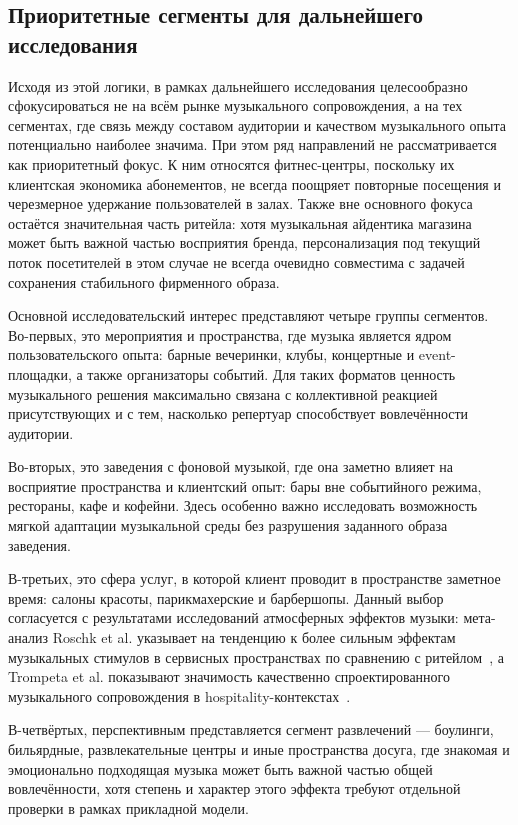 \subsection{Приоритетные сегменты для дальнейшего исследования}

Исходя из этой логики, в рамках дальнейшего исследования целесообразно сфокусироваться не на всём рынке музыкального сопровождения, а на тех сегментах, где связь между составом аудитории и качеством музыкального опыта потенциально наиболее значима. При этом ряд направлений не рассматривается как приоритетный фокус. К ним относятся фитнес-центры, поскольку их клиентская экономика абонементов, не всегда поощряет повторные посещения и черезмерное удержание пользователей в залах. Также вне основного фокуса остаётся значительная часть ритейла: хотя музыкальная айдентика магазина может быть важной частью восприятия бренда, персонализация под текущий поток посетителей в этом случае не всегда очевидно совместима с задачей сохранения стабильного фирменного образа.

Основной исследовательский интерес представляют четыре группы сегментов. Во-первых, это мероприятия и пространства, где музыка является ядром пользовательского опыта: барные вечеринки, клубы, концертные и event-площадки, а также организаторы событий. Для таких форматов ценность музыкального решения максимально связана с коллективной реакцией присутствующих и с тем, насколько репертуар способствует вовлечённости аудитории.

Во-вторых, это заведения с фоновой музыкой, где она заметно влияет на восприятие пространства и клиентский опыт: бары вне событийного режима, рестораны, кафе и кофейни. Здесь особенно важно исследовать возможность мягкой адаптации музыкальной среды без разрушения заданного образа заведения.

В-третьих, это сфера услуг, в которой клиент проводит в пространстве заметное время: салоны красоты, парикмахерские и барбершопы. Данный выбор согласуется с результатами исследований атмосферных эффектов музыки: мета-анализ Roschk et al. указывает на тенденцию к более сильным эффектам музыкальных стимулов в сервисных пространствах по сравнению с ритейлом~\cite{roschk2017atmospheric}, а Trompeta et al. показывают значимость качественно спроектированного музыкального сопровождения в hospitality-контекстах~\cite{trompeta2022music}.

В-четвёртых, перспективным представляется сегмент развлечений — боулинги, бильярдные, развлекательные центры и иные пространства досуга, где знакомая и эмоционально подходящая музыка может быть важной частью общей вовлечённости, хотя степень и характер этого эффекта требуют отдельной проверки в рамках прикладной модели.

